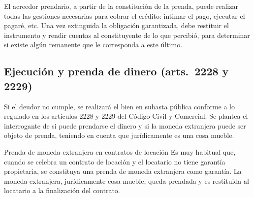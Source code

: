 \documentclass[12pt,oneside]{book}
\begin{document}
El acreedor prendario, a partir de la constitución de la prenda, puede realizar todas las gestiones necesarias para cobrar el crédito: intimar el pago, ejecutar el pagaré, etc. Una vez extinguida la obligación garantizada, debe restituir el instrumento y rendir cuentas al constituyente de lo que percibió, para determinar si existe algún remanente que le corresponda a este último.

\subsection{Ejecución y prenda de dinero (arts.~2228 y 2229)}

Si el deudor no cumple, se realizará el bien en subasta pública conforme a lo regulado en los artículos 2228 y 2229 del Código Civil y Comercial. Se plantea el interrogante de si puede prendarse el dinero y si la moneda extranjera puede ser objeto de prenda, teniendo en cuenta que jurídicamente es una cosa mueble.

\begin{example}{Prenda de moneda extranjera en contratos de locación}
Es muy habitual que, cuando se celebra un contrato de locación y el locatario no tiene garantía propietaria, se constituya una prenda de moneda extranjera como garantía. La moneda extranjera, jurídicamente cosa mueble, queda prendada y es restituida al locatario a la finalización del contrato.
\end{example}
\end{document}
